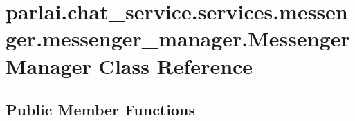 \hypertarget{classparlai_1_1chat__service_1_1services_1_1messenger_1_1messenger__manager_1_1MessengerManager}{}\section{parlai.\+chat\+\_\+service.\+services.\+messenger.\+messenger\+\_\+manager.\+Messenger\+Manager Class Reference}
\label{classparlai_1_1chat__service_1_1services_1_1messenger_1_1messenger__manager_1_1MessengerManager}
\subsection*{Public Member Functions}
